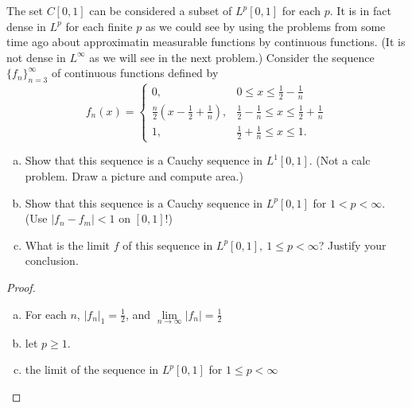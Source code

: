 \begin{pblm}%
	The set $C[0,1]$ can be considered a subset of $L^p[0,1]$ for each $p$. It is in 
	fact dense in $L^p$ for each finite $p$ as we could see by using the problems from 
	some time ago about approximatin measurable functions by continuous functions. (It 
	is not dense in $L^\infty$ as we will see in the next problem.) Consider the sequence 
	$\{f_n\}_{n=3}^\infty$ of continuous functions defined by 
	\begin{equation*}
		f_n(x) = \left\{
		\begin{matrix}
		0, & 0 \le x \le \frac{1}{2} - \frac{1}{n}\\
		\frac{n}{2}\left(x - \frac{1}{2} + \frac{1}{n}\right), & \frac{1}{2} - \frac{1}{n} \le x \le \frac{1}{2} + \frac{1}{n}\\
		1, & \frac{1}{2} + \frac{1}{n} \le x \le 1.
		\end{matrix}
		\right.
	\end{equation*}
	\begin{enumerate}[(a)]
		\item Show that this sequence is a Cauchy sequence in $L^1[0,1]$. (Not a 
			calc problem. Draw a picture and compute area.)
		\item Show that this sequence is a Cauchy sequence in $L^p[0,1]$ for $1 < p < \infty$. 
			(Use $|f_n - f_m| < 1$ on $[0,1]$!)
		\item What is the limit $f$ of this sequence in $L^p[0,1],~1\le p<\infty$? 
			Justify your conclusion. 
	\end{enumerate}
\begin{proof}
	\begin{center}
	\end{center}
	\begin{enumerate}[(a)]
		\item For each $n$, $|f_n|_1 = \frac{1}{2}$, and $\lim\limits_{n\to\infty} |f_n| = \frac{1}{2}$  
		\item let $p \ge 1$. 
		\item the limit of the sequence in $L^p[0,1]$ for $1 \le p < \infty$
	\end{enumerate}
\end{proof}
\end{pblm}

